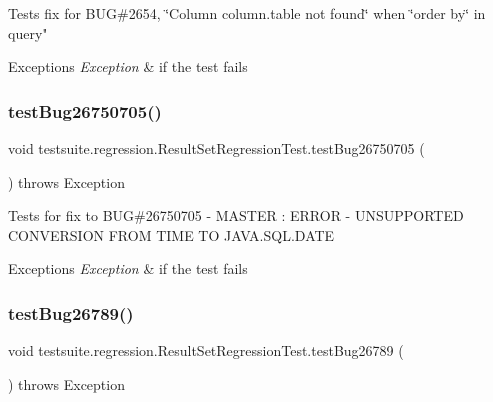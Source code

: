 Tests fix for B\+UG\#2654, \char`\"{}\+Column \textquotesingle{}column.\+table\textquotesingle{} not found\char`\"{} when \char`\"{}order by\char`\"{} in query"


\begin{DoxyExceptions}{Exceptions}
{\em Exception} & if the test fails \\
\hline
\end{DoxyExceptions}
\mbox{\label{classtestsuite_1_1regression_1_1_result_set_regression_test_ab55112fe15585a967fd38cf93a88972b}} 
\subsubsection{\texorpdfstring{test\+Bug26750705()}{testBug26750705()}}
{\footnotesize\ttfamily void testsuite.\+regression.\+Result\+Set\+Regression\+Test.\+test\+Bug26750705 (\begin{DoxyParamCaption}{ }\end{DoxyParamCaption}) throws Exception}

Tests for fix to B\+UG\#26750705 -\/ M\+A\+S\+T\+ER \+: E\+R\+R\+OR -\/ U\+N\+S\+U\+P\+P\+O\+R\+T\+ED C\+O\+N\+V\+E\+R\+S\+I\+ON F\+R\+OM T\+I\+ME TO J\+A\+V\+A.\+S\+Q\+L.\+D\+A\+TE


\begin{DoxyExceptions}{Exceptions}
{\em Exception} & if the test fails \\
\hline
\end{DoxyExceptions}
\mbox{\label{classtestsuite_1_1regression_1_1_result_set_regression_test_a025d8f10b5713673139e324fd77a7482}} 
\subsubsection{\texorpdfstring{test\+Bug26789()}{testBug26789()}}
{\footnotesize\ttfamily void testsuite.\+regression.\+Result\+Set\+Regression\+Test.\+test\+Bug26789 (\begin{DoxyParamCaption}{ }\end{DoxyParamCaption}) throws Exception}

